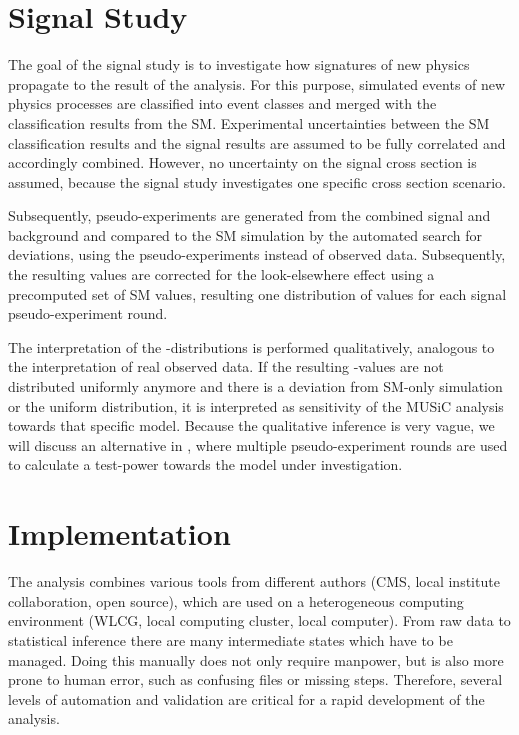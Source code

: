 \section{Signal Study}
The goal of the signal study is to investigate how signatures of new physics propagate to the result of the analysis. For this purpose, simulated events of new physics processes are classified into event classes and merged with the classification results from the \acl{SM}. Experimental uncertainties between the \ac{SM} classification results and the signal results are assumed to be fully correlated and accordingly combined. However, no uncertainty on the signal cross section is assumed, because the signal study investigates one specific cross section scenario.

Subsequently, pseudo-experiments are generated from the combined signal and background and compared to the \ac{SM} simulation by the automated search for deviations, using the pseudo-experiments instead of observed data. Subsequently, the resulting \TSmin values are corrected for the look-elsewhere effect using a precomputed set of \ac{SM} \TS values, resulting one distribution of \ptilde values for each signal pseudo-experiment round.

The interpretation of the \ptilde-distributions is performed qualitatively, analogous to the interpretation of real observed data. If the resulting \ptilde-values are not distributed uniformly anymore and there is a deviation from \ac{SM}-only simulation or the uniform distribution, it is interpreted as sensitivity of the \ac{MUSiC} analysis towards that specific model.
Because the qualitative inference is very vague, we will discuss an alternative in , where multiple pseudo-experiment rounds are used to calculate a test-power towards the model under investigation.

\section{Implementation}
The analysis combines various tools from different authors (\ac{CMS}, local institute collaboration, open source), which are used on a heterogeneous computing environment (\ac{WLCG}, local computing cluster, local computer). From raw data to statistical inference there are many intermediate states which have to be managed. Doing this manually does not only require manpower, but is also more prone to human error, such as confusing files or missing steps. Therefore, several levels of automation and validation are critical for a rapid development of the analysis.

